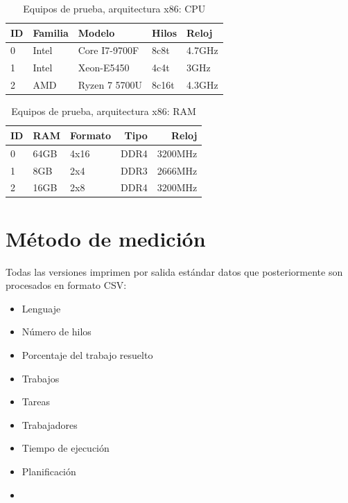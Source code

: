 \begin{center}
    \begin{table}[h]
        \centering
        \begin{tabular}{ l | l l l l }
            \hline
            ID & Familia & Modelo & Hilos & Reloj \\
            \hline
            0 & Intel & Core I7-9700F & 8c8t & 4.7GHz \\
            1 & Intel & Xeon-E5450 & 4c4t & 3GHz \\
            2 & AMD & Ryzen 7 5700U & 8c16t & 4.3GHz \\
            \hline
        \end{tabular}
        \caption{Equipos de prueba, arquitectura x86: CPU}
    \end{table}
\end{center}

\begin{center}
    \begin{table}[h]
        \centering
        \begin{tabular}{ l | l l r r}
            \hline
            ID & RAM & Formato & Tipo & Reloj \\
            \hline
            0 & 64GB & 4x16 & DDR4 & 3200MHz \\
            1 & 8GB & 2x4 & DDR3 & 2666MHz \\
            2 & 16GB & 2x8 & DDR4 & 3200MHz \\
            \hline
        \end{tabular}
        \caption{Equipos de prueba, arquitectura x86: RAM}
    \end{table}
\end{center}

\pagebreak

\section{Método de medición}

Todas las versiones imprimen por salida estándar datos que posteriormente son
procesados en formato CSV:

\begin{itemize}[itemsep=0.25px]
    \item Lenguaje
    \item Número de hilos
    \item Porcentaje del trabajo resuelto
    \item Trabajos
    \item Tareas
    \item Trabajadores
    \item Tiempo de ejecución
    \item Planificación
    \item {}
\end{itemize}

